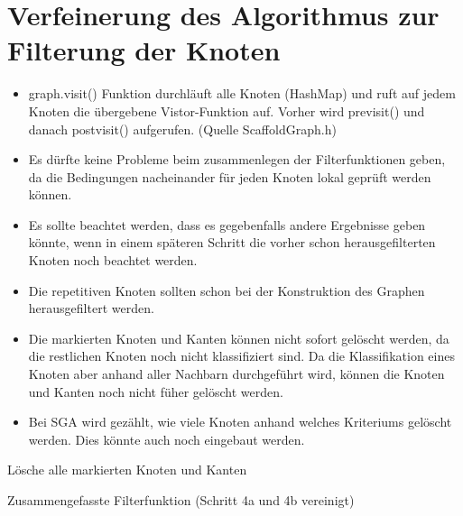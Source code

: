 \documentclass[a4paper,10pt,parskip]{scrartcl}
\begin{document}
\section{Verfeinerung des Algorithmus zur Filterung der Knoten}

\begin{itemize}
\item graph.visit() Funktion durchläuft alle Knoten (HashMap) und ruft
  auf jedem Knoten die übergebene Vistor-Funktion auf. Vorher wird
  previsit() und danach postvisit() aufgerufen. (Quelle
  ScaffoldGraph.h)
\item Es dürfte keine Probleme beim zusammenlegen der Filterfunktionen
  geben, da die Bedingungen nacheinander für jeden Knoten lokal
  geprüft werden können.
\item Es sollte beachtet werden, dass es gegebenfalls andere
  Ergebnisse geben könnte, wenn in einem späteren Schritt die vorher
  schon herausgefilterten Knoten noch beachtet werden.
\item Die repetitiven Knoten sollten schon bei der Konstruktion des
  Graphen herausgefiltert werden.
\item Die markierten Knoten und Kanten können nicht sofort gelöscht
  werden, da die restlichen Knoten noch nicht klassifiziert sind. Da
  die Klassifikation eines Knoten aber anhand aller Nachbarn
  durchgeführt wird, können die Knoten und Kanten noch nicht füher
  gelöscht werden.
\item Bei SGA wird gezählt, wie viele Knoten anhand welches Kriteriums
  gelöscht werden. Dies könnte auch noch eingebaut werden.
\end{itemize}

\begin{algorithm}[H]
  Lösche alle markierten Knoten und Kanten\;
  \caption{Zusammengefasste Filterfunktion (Schritt 4a und 4b vereinigt)}
\end{algorithm}
\end{document}
